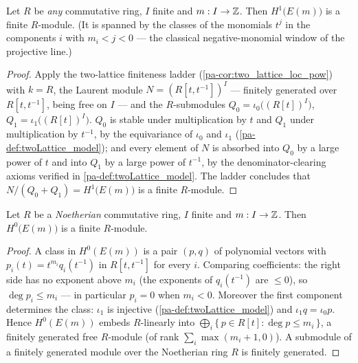 \begin{theorem}
  \label{pa-thm:moduleFinite_h1_model}
  \leanok

  Let \(R\) be \emph{any} commutative ring, \(I\) finite and \(m : I \to \mathbb{Z}\). Then
  \(H^1\bigl(E(m)\bigr)\) is a finite \(R\)-module. (It is spanned by the classes of
  the monomials \(t^j\) in the components \(i\) with \(m_i < j < 0\) --- the classical
  negative-monomial window of the projective line.)
\end{theorem}
\begin{proof}
  \leanok
  Apply the two-lattice finiteness ladder (\ref{pa-cor:two_lattice_loc_pow}) with
  \(k = R\), the Laurent module \(N = (R[t,t^{-1}])^I\) --- finitely generated over
  \(R[t,t^{-1}]\), being free on \(I\) --- and the \(R\)-submodules
  \(Q_0 = \iota_0\bigl((R[t])^I\bigr)\), \(Q_1 = \iota_1\bigl((R[t])^I\bigr)\). \(Q_0\)
  is stable under multiplication by \(t\) and \(Q_1\) under multiplication by
  \(t^{-1}\), by the equivariance of \(\iota_0\) and \(\iota_1\)
  (\ref{pa-def:twoLattice_model}); and every element of \(N\) is absorbed into \(Q_0\) by
  a large power of \(t\) and into \(Q_1\) by a large power of \(t^{-1}\), by the
  denominator-clearing axioms verified in \ref{pa-def:twoLattice_model}. The ladder
  concludes that \(N/(Q_0 + Q_1) = H^1\bigl(E(m)\bigr)\) is a finite \(R\)-module.
\end{proof}

\begin{theorem}
  \label{pa-thm:moduleFinite_h0_model}
  \leanok

  Let \(R\) be a \emph{Noetherian} commutative ring, \(I\) finite and \(m : I \to \mathbb{Z}\).
  Then \(H^0\bigl(E(m)\bigr)\) is a finite \(R\)-module.
\end{theorem}
\begin{proof}
  \leanok
  A class in \(H^0(E(m))\) is a pair \((p, q)\) of polynomial vectors with
  \(p_i(t) = t^{m_i} q_i(t^{-1})\) in \(R[t,t^{-1}]\) for every \(i\). Comparing
  coefficients: the right side has no exponent above \(m_i\) (the exponents of
  \(q_i(t^{-1})\) are \(\le 0\)), so \(\deg p_i \le m_i\) --- in particular \(p_i = 0\)
  when \(m_i < 0\). Moreover the first component determines the class: \(\iota_1\) is
  injective (\ref{pa-def:twoLattice_model}) and \(\iota_1 q = \iota_0 p\). Hence
  \(H^0(E(m))\) embeds \(R\)-linearly into
  \(\bigoplus_{i} \{\, p \in R[t] : \deg p \le m_i \,\}\), a finitely generated free
  \(R\)-module (of rank \(\sum_i \max(m_i + 1, 0)\)). A submodule of a finitely
  generated module over the Noetherian ring \(R\) is finitely generated.
\end{proof}

